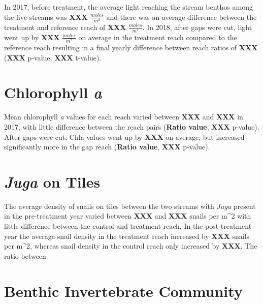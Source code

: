 \documentclass[double,12pt]{beavtex}
\begin{document}
  In 2017, before treatment, the average light reaching the stream benthos
  among the five streams was \textbf{XXX} \(\frac{moles}{m^2}\) and there
  was an average difference between the treatment and reference reach of
  \textbf{XXX} \(\frac{moles}{m^2}\). In 2018, after gaps were cut, light
  went up by \textbf{XXX} \(\frac{moles}{m^2}\) on average in the
  treatment reach compared to the reference reach resulting in a final
  yearly difference between reach ratios of \textbf{XXX} (\textbf{XXX}
  p-value, \textbf{XXX} t-value).
  
  \section*{\texorpdfstring{Chlorophyll
  \emph{a}}{Chlorophyll a}}\label{chlorophyll-a-1}
  
  Mean chlorophyll \emph{a} values for each reach varied between
  \textbf{XXX} and \textbf{XXX} in 2017, with little difference between
  the reach pairs (\textbf{Ratio value}, \textbf{XXX} p-value). After gaps
  were cut, Chla values went up by \textbf{XXX} on average, but increased
  significantly more in the gap reach (\textbf{Ratio value}, \textbf{XXX}
  p-value).
  
  \section*{\texorpdfstring{\emph{Juga} on
  Tiles}{Juga on Tiles}}\label{juga-on-tiles}
  
  The average density of snails on tiles between the two streams with
  \emph{Juga} present in the pre-treatment year varied between
  \textbf{XXX} and \textbf{XXX} snails per m\^{}2 with little difference
  between the control and treatment reach. In the post treatment year the
  average snail density in the treatment reach increased by \textbf{XXX}
  snails per m\^{}2, whereas snail density in the control reach only
  increased by \textbf{XXX}. The ratio between
  
  \section*{Benthic Invertebrate
  Community}\label{benthic-invertebrate-community}
  
\end{document}

